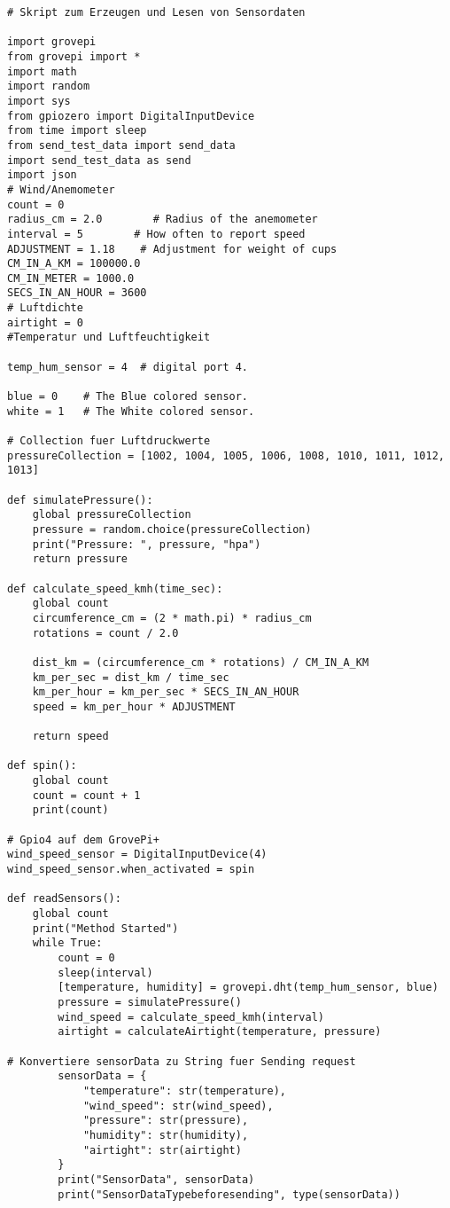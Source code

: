 \begin{lstlisting}
# Skript zum Erzeugen und Lesen von Sensordaten

import grovepi
from grovepi import *
import math
import random
import sys
from gpiozero import DigitalInputDevice
from time import sleep
from send_test_data import send_data
import send_test_data as send
import json
# Wind/Anemometer
count = 0
radius_cm = 2.0        # Radius of the anemometer
interval = 5        # How often to report speed
ADJUSTMENT = 1.18    # Adjustment for weight of cups
CM_IN_A_KM = 100000.0
CM_IN_METER = 1000.0
SECS_IN_AN_HOUR = 3600
# Luftdichte
airtight = 0
#Temperatur und Luftfeuchtigkeit

temp_hum_sensor = 4  # digital port 4.

blue = 0    # The Blue colored sensor.
white = 1   # The White colored sensor.

# Collection fuer Luftdruckwerte
pressureCollection = [1002, 1004, 1005, 1006, 1008, 1010, 1011, 1012, 1013]
 
def simulatePressure():
    global pressureCollection
    pressure = random.choice(pressureCollection)
    print("Pressure: ", pressure, "hpa")
    return pressure

def calculate_speed_kmh(time_sec):
    global count
    circumference_cm = (2 * math.pi) * radius_cm
    rotations = count / 2.0

    dist_km = (circumference_cm * rotations) / CM_IN_A_KM
    km_per_sec = dist_km / time_sec
    km_per_hour = km_per_sec * SECS_IN_AN_HOUR
    speed = km_per_hour * ADJUSTMENT

    return speed

def spin():
    global count
    count = count + 1
    print(count)

# Gpio4 auf dem GrovePi+
wind_speed_sensor = DigitalInputDevice(4)
wind_speed_sensor.when_activated = spin

def readSensors():
    global count
    print("Method Started")
    while True:
        count = 0
        sleep(interval)
        [temperature, humidity] = grovepi.dht(temp_hum_sensor, blue)
        pressure = simulatePressure()
        wind_speed = calculate_speed_kmh(interval)
        airtight = calculateAirtight(temperature, pressure)

# Konvertiere sensorData zu String fuer Sending request
        sensorData = {
            "temperature": str(temperature),
            "wind_speed": str(wind_speed),
            "pressure": str(pressure),
            "humidity": str(humidity),
            "airtight": str(airtight)
        }
        print("SensorData", sensorData)
        print("SensorDataTypebeforesending", type(sensorData))


\end{lstlisting}
